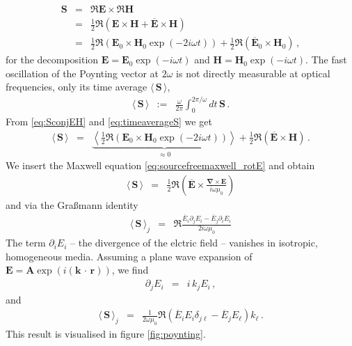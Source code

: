 \documentclass[12pt,a4paper,twoside,openright,BCOR10mm,headsepline,titlepage,abstracton,chapterprefix,final]{scrreprt}
\newcommand\Vector[1]{{\mathbf{#1}}}
\newcommand\vacuum{0}
\newcommand\Location{\Vector{r}}
\newcommand\wavenumber{k}
\newcommand\Nabla{\Vector{\nabla}}
\newcommand{\scpm}[2]{(#1\,\cdot\,#2)}
\newcommand\scalarEfield{E}
\newcommand\scalarHfield{H}
\newcommand\Efield{\Vector{\scalarEfield}}
\newcommand\Hfield{\Vector{\scalarHfield}}
\newcommand\vacuumpermeability{\scalarpermeability_{\vacuum}}
\newcommand\scalarpermeability{\mu}
\newcommand{\timeavg}[1]{{\langle\,#1\,\rangle}}
\begin{document}
\begin{eqnarray}
 \Vector{S} &=& \Re \Efield \times \Re \Hfield \nonumber \\
            &=& \frac{1}{2} \Re ( \Efield \times \Hfield + \overline{\Efield} \times \Hfield ) \nonumber \\
            &=& \frac{1}{2} \Re ( \Efield_0 \times \Hfield_0 \exp(-2i\omega t) )
	      + \frac{1}{2} \Re ( \overline{\Efield}_0 \times \Hfield_0 ) \label{eq:SconjEH}\,,
\end{eqnarray}
for the decomposition $\Efield = \Efield_0 \exp(-i\omega t)$ and $\Hfield = \Hfield_0 \exp(-i\omega t)$.
The fast oscillation of the Poynting vector at $2 \omega$ is not directly measurable at optical frequencies, only its time average $\timeavg{\Vector{S}}$,
\begin{eqnarray}
 \timeavg{\Vector{S}}  &:=& \frac{\omega}{2\pi} \int_{0}^{2\pi / \omega} dt \, \Vector{S} \label{eq:timeaverageS}\,.
\end{eqnarray}
From \eqref{eq:SconjEH} and \eqref{eq:timeaverageS} we get
\begin{eqnarray}
  \timeavg{\Vector{S}}   &=& \underbrace{\left\langle \frac{1}{2} \Re ( \Efield_0 \times \Hfield_0 \exp(-2i\omega t) )\right\rangle}_{\approx0} + \frac{1}{2} \Re ( \overline{\Efield} \times \Hfield )\,.
\end{eqnarray}
We insert the Maxwell equation \eqref{eq:sourcefreemaxwell_rotE} and obtain
\begin{eqnarray}
 \timeavg{\Vector{S}}   &=& \frac{1}{2} \Re \left( \overline{\Efield} \times \frac{\Nabla \times \Efield}{i \omega \vacuumpermeability} \right)
\end{eqnarray}
and via the Gra\ss mann identity 
\begin{eqnarray}
  \timeavg{\Vector{S}}_j &=&  \Re \frac{ \overline{\scalarEfield}_i \partial_j \scalarEfield_i - \overline{\scalarEfield}_j \partial_i \scalarEfield_i }{2 i \omega \vacuumpermeability}
\end{eqnarray}
The term $\partial_i \scalarEfield_i$ -- the divergence of the elctric field -- vanishes in isotropic, homogeneous media.
Assuming a plane wave expansion of $\Efield = \Vector{A} \exp(i \scpm{\Vector{k}}{\Location})$, we find
\begin{eqnarray}
  \partial_j E_i &=& i\,k_j E_i\,,
\end{eqnarray}
and
\begin{eqnarray}
 \timeavg{\Vector{S}}_j &=&  
    \frac{1}{2 \omega \vacuumpermeability}\Re( 
	\overline{\scalarEfield}_i \scalarEfield_i \delta_{j\ell}  
	- \overline{\scalarEfield}_j \scalarEfield_\ell 
      ) \wavenumber_\ell\,.\label{eq:poyntingvector}
\end{eqnarray}
This result is visualised in figure \ref{fig:poynting}.
\end{document}
